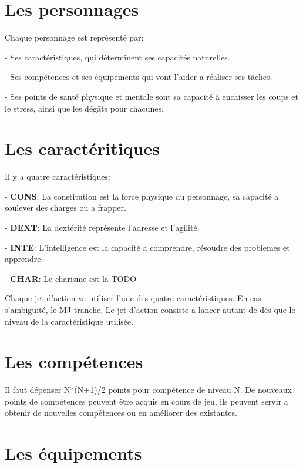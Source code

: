 ﻿
\section{Les personnages} 

Chaque personnage est représenté par:

- Ses caractéristiques, qui déterminent ses capacités naturelles.

- Ses compétences et ses équipements qui vont l'aider a réaliser ses tâches.

- Ses points de santé physique et mentale sont sa capacité à encaisser les coups et le stress, ainsi que les dégâts pour chacunes.


\section{Les caractéritiques}

Il y a quatre caractéristiques:

- \textbf{CONS}: La constitution est la force physique du personnage, sa capacité a soulever des charges ou a frapper.

- \textbf{DEXT}: La dextérité représente l'adresse et l'agilité.

- \textbf{INTE}: L’intelligence est la capacité a comprendre, résoudre des problemes et apprendre.

- \textbf{CHAR}: Le charisme est la TODO

Chaque jet d'action va utiliser l'une des quatre caractéristiques. En cas s'ambiguité, le MJ tranche. Le jet d'action consiste a lancer autant de dés que le niveau de la caractéristique utilisée.
	

\section{Les compétences}

Il faut dépenser N*(N+1)/2 points pour compétence de niveau N. De nouveaux points de compétences peuvent être acquis en cours de jeu, ils peuvent servir a obtenir de nouvelles compétences ou en améliorer des existantes.


\section{Les équipements}

